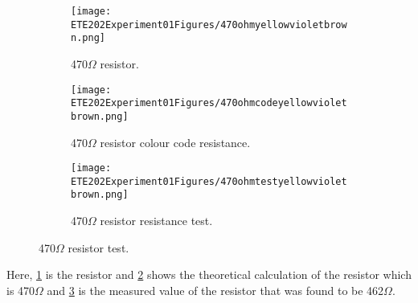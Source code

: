 \documentclass[a4paper, 14pt]{extarticle}
\begin{document}
            \vspace{3cm}
            
            \begin{figure}[htbp]
            \centering
                \begin{subfigure}[h]{0.3\textwidth}
                \centering
                    \texttt{[image: ETE202Experiment01Figures/470ohmyellowvioletbrown.png]}
                    \caption{470$\Omega$ resistor.}
                    \label{fig:subfig12}
                \end{subfigure}
                \hfill
                \begin{subfigure}[H]{0.3\textwidth}
                \centering
                    \texttt{[image: ETE202Experiment01Figures/470ohmcodeyellowvioletbrown.png]}
                    \caption{470$\Omega$ resistor colour code resistance.}
                    \label{fig:subfig13}
                \end{subfigure}
                \hfill
                \begin{subfigure}[h]{0.3\textwidth}
                \centering
                    \texttt{[image: ETE202Experiment01Figures/470ohmtestyellowvioletbrown.png]}
                    \caption{470$\Omega$ resistor resistance test.}
                    \label{fig:subfig14}
                \end{subfigure}
                \caption{470$\Omega$ resistor test.}
                \label{fig:mainfig5}
            \end{figure}
            Here, \ref{fig:subfig12} is the resistor and \ref{fig:subfig13} shows the theoretical calculation of the resistor which is 470$\Omega$ and \ref{fig:subfig14} is the measured value of the resistor that was found to be 462$\Omega$.

            \newpage
            
\end{document}

